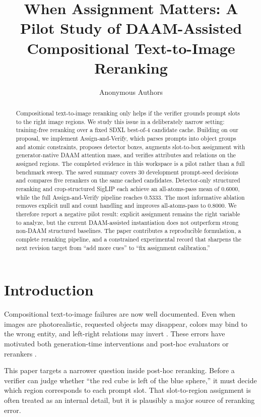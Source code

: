 \documentclass{article}
\title{When Assignment Matters: A Pilot Study of DAAM-Assisted Compositional Text-to-Image Reranking}
\author{Anonymous Authors}
\newcommand{\method}{Assign-and-Verify\xspace}
\newcommand{\daam}{DAAM\xspace}
\newcommand{\sdxl}{SDXL\xspace}
\begin{document}
\maketitle

\begin{abstract}
Compositional text-to-image reranking only helps if the verifier grounds prompt slots to the right image regions. We study this issue in a deliberately narrow setting: training-free reranking over a fixed \sdxl best-of-4 candidate cache. Building on our proposal, we implement \method, which parses prompts into object groups and atomic constraints, proposes detector boxes, augments slot-to-box assignment with generator-native \daam attention mass, and verifies attributes and relations on the assigned regions. The completed evidence in this workspace is a pilot rather than a full benchmark sweep. The saved summary covers 30 development prompt-seed decisions and compares five rerankers on the same cached candidates. Detector-only structured reranking and crop-structured SigLIP each achieve an all-atoms-pass mean of 0.6000, while the full \method pipeline reaches 0.5333. The most informative ablation removes explicit null and count handling and improves all-atoms-pass to 0.8000. We therefore report a negative pilot result: explicit assignment remains the right variable to analyze, but the current \daam-assisted instantiation does not outperform strong non-\daam structured baselines. The paper contributes a reproducible formulation, a complete reranking pipeline, and a constrained experimental record that sharpens the next revision target from ``add more cues'' to ``fix assignment calibration.''
\end{abstract}

\section{Introduction}

Compositional text-to-image failures are now well documented. Even when images are photorealistic, requested objects may disappear, colors may bind to the wrong entity, and left-right relations may invert \citep{ghosh2023geneval,huang2023t2icompbench}. These errors have motivated both generation-time interventions \citep{hu2024token,Dat_2025_ICCV,zhang-wan-2025-r,rastegar2025infsplign} and post-hoc evaluators or rerankers \citep{deiseroth2022logicrank,miranda2025simplestructure,hosseini2025t2ifineeval,wan2025compalign}.

This paper targets a narrower question inside post-hoc reranking. Before a verifier can judge whether ``the red cube is left of the blue sphere,'' it must decide which region corresponds to each prompt slot. That slot-to-region assignment is often treated as an internal detail, but it is plausibly a major source of reranking error.
\end{document}
